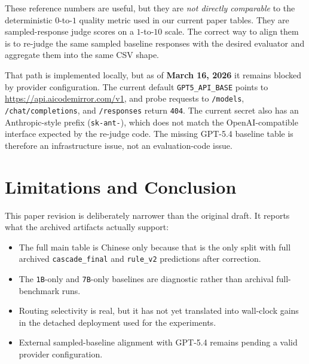\documentclass{article}
\newcommand{\tighttable}[1]{%
  \begingroup
  \setlength{\tabcolsep}{5pt}%
  \renewcommand{\arraystretch}{1.12}%
  #1%
  \endgroup
}
\begin{document}
These reference numbers are useful, but they are \emph{not directly comparable} to the deterministic \(0\)-to-\(1\) quality metric used in our current paper tables. They are sampled-response judge scores on a \(1\)-to-\(10\) scale. The correct way to align them is to re-judge the same sampled baseline responses with the desired evaluator and aggregate them into the same CSV shape.

That path is implemented locally, but as of \textbf{March 16, 2026} it remains blocked by provider configuration. The current default \texttt{GPT5\_API\_BASE} points to \url{https://api.aicodemirror.com/v1}, and probe requests to \texttt{/models}, \texttt{/chat/completions}, and \texttt{/responses} return \texttt{404}. The current secret also has an Anthropic-style prefix (\texttt{sk-ant-}), which does not match the OpenAI-compatible interface expected by the re-judge code. The missing GPT-5.4 baseline table is therefore an infrastructure issue, not an evaluation-code issue.

\begin{table}[H]
\centering
\caption{Official EduBench sampled baseline reference under the GPT-4o evaluator. These values come from the provided baseline CSV and are shown as external context only.}
\label{tab:edubench_reference}
\small
\tighttable{}
\end{table}
\FloatBarrier

\section{Limitations and Conclusion}
This paper revision is deliberately narrower than the original draft. It reports what the archived artifacts actually support:
\begin{itemize}
    \item The full main table is Chinese only because that is the only split with full archived \texttt{cascade\_final} and \texttt{rule\_v2} predictions after correction.
    \item The \texttt{1B}-only and \texttt{7B}-only baselines are diagnostic rather than archival full-benchmark runs.
    \item Routing selectivity is real, but it has not yet translated into wall-clock gains in the detached deployment used for the experiments.
    \item External sampled-baseline alignment with GPT-5.4 remains pending a valid provider configuration.
\end{itemize}
\end{document}

